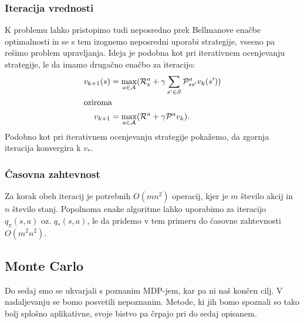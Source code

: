 \documentclass[12pt,a4paper]{amsart}
\theoremstyle{definition} %
\theoremstyle{plain} %
\begin{document}
\subsubsection{Iteracija vrednosti}
K problemu lahko pristopimo tudi neposredno prek Bellmanove enačbe optimalnosti in se s tem 
izognemo neposredni uporabi strategije, vseeno pa rešimo problem upravljanja. Ideja je podobna kot 
pri iterativnem ocenjevanju strategije, le da imamo drugačno enačbo za iteracijo: 
\begin{align*}
    v_{k+1}(s) &= \max_{a \in \mathcal{A}} ( \mathcal{R}_s^a + 
        \gamma \sum_{s' \in \mathcal{S}} \mathcal{P}_{ss'}^a v_k(s') ) \\
    \intertext{oziroma}
    v_{k+1} &= \max_{a \in \mathcal{A}} (\mathcal{R}^a + \gamma \mathcal{P}^a v_k).
\end{align*}
Podobno kot pri iterativnem ocenjevanju strategije pokažemo, da zgornja iteracija konvergira k 
$v_*$.

\subsubsection{Časovna zahtevnost}
Za korak obeh iteracij je potrebnih $O(mn^2)$ operacij, kjer je $m$ število akcij in $n$ število 
stanj. Popolnoma enake algoritme lahko uporabimo za iteracijo $q_\pi(s, a)$ oz. $q_*(s, a)$, le 
da pridemo v tem primeru do časovne zahtevnosti $O(m^2n^2)$.

\subsection{Monte Carlo}
Do sedaj smo se ukvarjali s poznanim MDP-jem, kar pa ni naš končen cilj. V nadaljevanju se bomo 
posvetili nepoznanim. Metode, ki jih bomo spoznali so tako bolj splošno aplikativne, svoje 
bistvo pa črpajo pri do sedaj opisanem.
\end{document}
